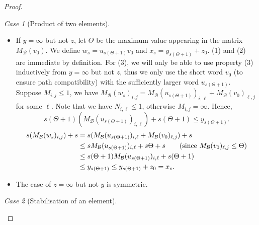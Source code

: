 \documentclass{lmcs}
\theoremstyle{remark}
\newtheorem{case}{Case}
\newcommand{\autB}{\mathcal{B}}
\theoremstyle{remark}
\begin{document}
\begin{proof}
\begin{case}[Product of two elements]
\begin{itemize}
\item If $y=\infty$ but not $z$, let $\Theta$ be the maximum value appearing in the matrix $M_\autB(v_0)$. We define $w_s = u_{s(\Theta+1)}v_0$ and $x_s = y_{s(\Theta+1)}+z_0$. (1) and (2) are immediate by definition. For (3), we will only be able to use property (3) inductively from $y=\infty$ but not $z$, thus we only use the short word $v_0$ (to ensure path compatibility) with the sufficiently larger word $u_{s(\Theta+1)}$. Suppose $M_{i,j} \le 1$, we have $M_\autB(w_s)_{i,j} = M_\autB(u_{s(\Theta+1)})_{i,\ell} + M_\autB(v_0)_{\ell,j}$ for some $\ell$.
Note that we have $N_{i,\ell} \le 1$, otherwise $M_{i,j} = \infty$. Hence, 
$$s(\Theta+1)(M_\autB(u_{s(\Theta+1)})_{i,\ell})+ {s(\Theta+1)} \le y_{s(\Theta+1)}.$$ 
\begin{align*}
s(M_\autB(w_s)_{i,j}) + s & = s(M_\autB(u_{s(\Theta+1)})_{i,\ell} + M_\autB(v_0)_{\ell,j} ) + s
\\ &\le sM_\autB(u_{s(\Theta+1)})_{i,\ell} + s\Theta +s  \tag{since $M_\autB(v_0)_{\ell,j} \le \Theta$}
\\ &\le s(\Theta+1)M_\autB(u_{s(\Theta+1)})_{i,\ell} +s(\Theta+1)
\\ &\le y_{s(\Theta+1)} \le y_{s(\Theta+1)} + z_0 = x_s.
\end{align*}

\item The case of $z=\infty$ but not $y$ is symmetric.
\end{itemize}

\end{case}
\begin{case}[Stabilisation of an element]


\end{case}
\end{proof}
\end{document}
